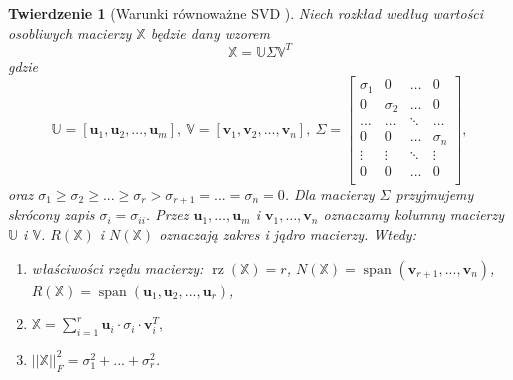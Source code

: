 \documentclass[12pt,a4paper]{report}
\newtheorem{tw}[df]{Twierdzenie}
\newcommand{\przestrzen}[1]{\operatorname{span}\left({#1} \right)}
\newcommand{\rz}[1]{\operatorname{rz}\left({#1} \right)}
\begin{document}
\begin{tw}[Warunki równoważne SVD {\citep{ulafiir}}]%
Niech rozkład według wartości osobliwych macierzy $\mathbb{X}$ będzie dany wzorem
$$
\mathbb{X}=\mathbb{U} \Sigma \mathbb{V}^T
$$
gdzie 
$$\mathbb{U}=[\mathbf{u}_1,\mathbf{u}_2,...,\mathbf{u}_m], \: \mathbb{V} = [\mathbf{v}_1,\mathbf{v}_2,...,\mathbf{v}_n], \: \Sigma = \left[
        \begin{array}{cccc}
         \sigma_{1} & 0 & \ldots & 0 \\
         0 & \sigma_{2} & \ldots & 0 \\
         \ldots & \ldots& \ddots & \ldots \\
         0 & 0 & \ldots & \sigma_{n} \\
         \vdots & \vdots & \ddots & \vdots \\
         0 & 0 & \ldots & 0 \\
         \end{array}
      \right],$$
oraz 
$\sigma_{1}\geq \sigma_{2} \geq ... \geq \sigma_{r} > \sigma_{r+1} = ... = \sigma_{n} = 0$. Dla macierzy $\Sigma$ przyjmujemy skrócony zapis $\sigma_{i} = \sigma_{ii}$. Przez $\mathbf{u}_1, \ldots, \mathbf{u}_m$ i $\mathbf{v}_1, \ldots, \mathbf{v}_n$ oznaczamy kolumny macierzy $\mathbb{U}$ i $\mathbb{V}$.
$R(\mathbb{X})$ i $N(\mathbb{X})$ oznaczają zakres i jądro macierzy.
Wtedy:
\begin{enumerate}
\item właściwości rzędu macierzy: $\rz{\mathbb{X}} = r$, $N(\mathbb{X}) = \przestrzen{\mathbf{v}_{r+1},...,\mathbf{v}_n}$, 
$R(\mathbb{X}) = \przestrzen{\mathbf{u}_1,\mathbf{u}_2,...,\mathbf{u}_r}$,
\item $\mathbb{X} = \sum_{i=1}^r \mathbf{u}_i \cdot\sigma_i \cdot \mathbf{v}_i^T,$
\item $||\mathbb{X}||_F^2 = \sigma_{1}^2+...+\sigma_{r}^2$.
\end{enumerate}
\end{tw}
\end{document}
